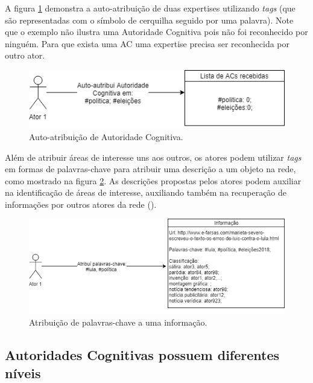 A figura \ref{fig:diagrama_auto-atribuida} demonstra a auto-atribuição de duas expertises utilizando \emph{tags} (que são representadas com o símbolo de cerquilha seguido por uma palavra). Note que o exemplo não ilustra uma Autoridade Cognitiva pois não foi reconhecido por ninguém. Para que exista uma AC uma expertise precisa ser reconhecida por outro ator.

\begin{figure}[ht]
\centering
\includegraphics[scale=0.65]{4-proposta/diagrama_auto-autribuida.png}
\caption{Auto-atribuição de Autoridade Cognitiva.}
\label{fig:diagrama_auto-atribuida}
\end{figure}

Além de atribuir áreas de interesse uns aos outros, os atores podem utilizar \emph{tags} em formas de palavras-chave para atribuir uma descrição a um objeto na rede, como mostrado na figura \ref{fig:diagrama_palavras-chave}. As descrições propostas pelos atores podem auxiliar na identificação de áreas de interesse, auxiliando também na recuperação de informações por outros atores da rede (\cite{pereira_folkauthority:_2008}).

\begin{figure}[ht]
\centering
\includegraphics[scale=0.65]{4-proposta/diagrama_atribuicao_tags.png}
\caption{Atribuição de palavras-chave a uma informação.}
\label{fig:diagrama_palavras-chave}
\end{figure}


\subsection{Autoridades Cognitivas possuem diferentes níveis}

